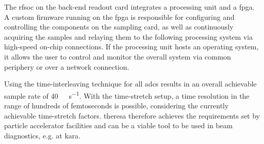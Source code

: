 The \gls{rfsoc} on the back-end readout card integrates a processing unit and a \gls{fpga}. 
A custom firmware running on the \gls{fpga} is responsible for configuring and controlling the components on the sampling card, as well as continuously acquiring the samples and relaying them to the following processing system via high-speed on-chip connections.
If the processing unit hosts an operating system, it allows the user to control and monitor the overall system via common periphery or over a network connection.

Using the time-interleaving technique for all \glspl{adc} results in an overall achievable sample rate of \SI{40}{\giga \sample \per \second}.
With the time-stretch setup, a time resolution in the range of hundreds of femtoseconds is possible, considering the currently achievable time-stretch factors.
\gls{theresa} therefore achieves the requirements set by particle accelerator facilities and can be a viable tool to be used in beam diagnostics, e.g. at \gls{kara}.
